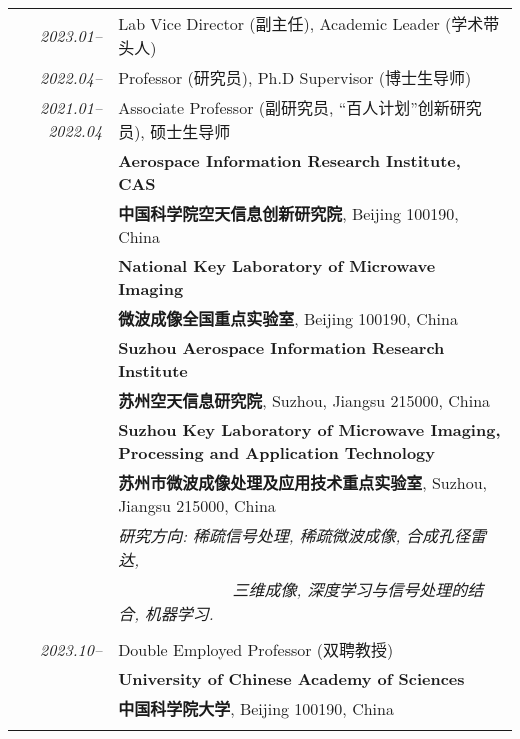 \documentclass[paper=a4,fontsize=11pt]{scrartcl}
\begin{document}
\begin{longtable}{r|p{12cm}}
\emph{2023.01--} & Lab Vice Director (副主任), Academic Leader (学术带头人)\\	
\emph{2022.04--} & Professor (研究员), Ph.D Supervisor (博士生导师)\\	
\emph{2021.01--2022.04} & Associate Professor (副研究员, ``百人计划''创新研究员), 硕士生导师\\	
	& \normalsize\textbf{Aerospace Information Research Institute, CAS}\\
	& \normalsize\textbf{中国科学院空天信息创新研究院}, Beijing 100190, China \\
	& \normalsize\textbf{National Key Laboratory of Microwave Imaging}\\
	& \normalsize\textbf{微波成像全国重点实验室}, Beijing 100190, China \\
	& \normalsize\textbf{Suzhou Aerospace Information Research Institute}\\
	& \normalsize\textbf{苏州空天信息研究院}, Suzhou, Jiangsu 215000, China\\
	& \normalsize\textbf{Suzhou Key Laboratory of Microwave Imaging, Processing and Application Technology}\\
	& \normalsize\textbf{苏州市微波成像处理及应用技术重点实验室}, Suzhou, Jiangsu 215000, China\\
	& \emph{研究方向: 稀疏信号处理, 稀疏微波成像, 合成孔径雷达,}\\
	& \emph{~~~~~~~~~~~~~~三维成像, 深度学习与信号处理的结合, 机器学习.} \\
	\multicolumn{2}{c}{} \\
	
\emph{2023.10--} & Double Employed Professor (双聘教授)\\	
& \normalsize\textbf{University of Chinese Academy of Sciences}\\
& \normalsize\textbf{中国科学院大学}, Beijing 100190, China \\
\multicolumn{2}{c}{} \\


\end{longtable}
\end{document}
